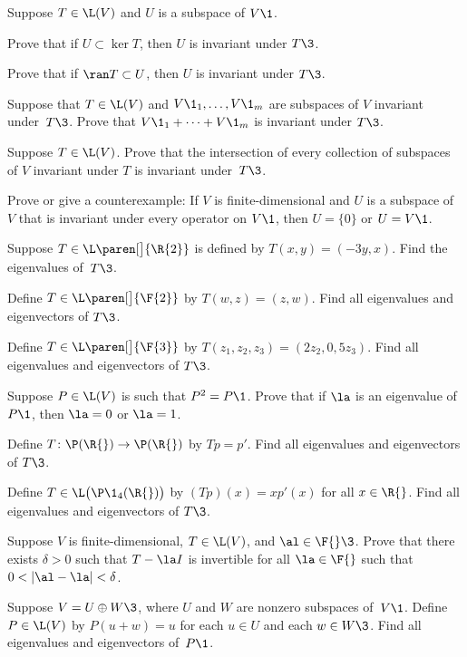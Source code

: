 
\exercise
Suppose $T \in \L(V)$ and $U$ is a subspace of $V\1$.
\begin{subtheorem}
\item
Prove that if $U \subset \ker T$, then $U$ is invariant under $T\3$.
\item
Prove that if $\ran T \subset U$, then $U$ is invariant under $T\3$.
\end{subtheorem}
\exercisesubtheoremend


\exercise
Suppose that $T \in \L(V)$ and $V\1_1, \dots, V\1_m$ are subspaces of $V$
invariant under~$T\3$. Prove that $V\1_1 + \dots + V\1_m$ is invariant under $T\3$.


\exercise
Suppose $T \in \L(V)$.  Prove that the intersection of every collection of
subspaces of $V$ invariant under $T$ is invariant under~$T\3$.


\exercise
Prove or give a counterexample: If $V$ is finite-dimensional and $U$ is a subspace of $V$ that is invariant
under every operator on $V\1$, then $U = \{0\}$ or $U = V\1$.


\exercise
Suppose $T \in \L\paren[\big]{\R{2}}$ is defined by $T(x, y) = (-3y, x)$. Find the eigenvalues of~$T\3$.


\exercise
Define $T \in \L\paren[\big]{\F{2}}$ by
$
T(w, z) = (z, w)$.
Find all eigenvalues and eigenvectors of $T\3$.


\exercise
Define $T \in \L\paren[\big]{\F{3}}$ by
$
T(z_1, z_2, z_3) = (2 z_2, 0, 5z_3)$.
Find all eigenvalues and eigenvectors of $T\3$.


\exercise
Suppose $P \in \L(V)$ is such that $P^2 = P\1$. Prove that if $\la$ is an eigenvalue of~$P\1$, then $\la = 0$ or
$\la = 1$.\label{5P}


\exercise
Define $T \colon \P(\R{}) \to \P(\R{})$ by $Tp = p'\!$. Find all eigenvalues and eigenvectors of $T\3$.


\exercise
Define $T \in \L\bigl( \P\1_4(\R{}) \bigr)$ by
$
(Tp)(x) = x p' \! (x)
$
for all $x \in \R{}$. Find all eigenvalues and eigenvectors of $T\3$.


\exercise
Suppose $V$ is finite-dimensional, $T \in \L(V)$, and $\al \in \F{}\3$. Prove that there exists $\delta > 0$ such that
$T - \la I$ is invertible for all $\la \in \F{}$ such that \mbox{$0 < |\al - \la| < \delta$}.


\exercise
Suppose $V = U \oplus W\3$,  where $U$ and $W$ are nonzero subspaces of~$V\1$. Define $P \in \L(V)$ by $P(u + w) = u$ for each $u \in U$ and each $w \in W\3$. Find all eigenvalues and eigenvectors of~$P\1$.


